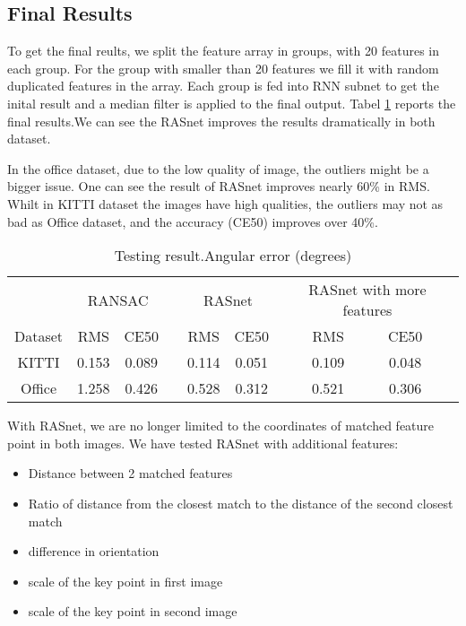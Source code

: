 \documentclass{article}
\begin{document}

\subsection{Final Results}
To get the final reults, we split the feature array in groups, with 20 features in each group. For the group with smaller than 20 features we fill it with random duplicated features in the array. Each group is fed into RNN subnet to get the inital result and a median filter is applied to the final output. Tabel \ref{fresults} reports the final results.We can see the RASnet improves the results dramatically in both dataset.

In the office dataset, due to the low quality of image, the outliers might be a bigger issue. One can see the result of RASnet improves nearly 60\% in RMS. Whilt in KITTI dataset the images have high qualities, the outliers may not as bad as Office dataset, and the accuracy (CE50) improves over 40\%.


\begin{table}[h]
  \centering
  \begin{tabular}{cccccccccc}
     \toprule
  & \multicolumn{2}{c}{RANSAC} & & \multicolumn{2}{c}{RASnet}     & & \multicolumn{2}{p{2cm}}{RASnet with more features}  \\
\cline{2-3}
\cline{5-6}
\cline{8-9}
     Dataset & RMS & CE50  &&RMS & CE50  &&RMS & CE50  \\ 
  \hline KITTI      &0.153     &0.089      && 0.114 & 0.051   && 0.109   & 0.048   \\ 
  \hline Office     &1.258     &0.426      && 0.528 &0.312    && 0.521   & 0.306    \\ 
    \bottomrule
  \end{tabular}
  \caption{Testing result.Angular error (degrees)}
  \label{fresults}
\end{table}

With RASnet, we are no longer limited to the coordinates of matched feature point in both images. 
We have tested RASnet with additional features:

\begin{itemize}
\item Distance between 2 matched features
\item Ratio of distance from the closest match to the distance of the second closest match
\item difference in orientation
\item scale of the key point in first image
\item scale of the key point in second image
\end{itemize}
\end{document}
